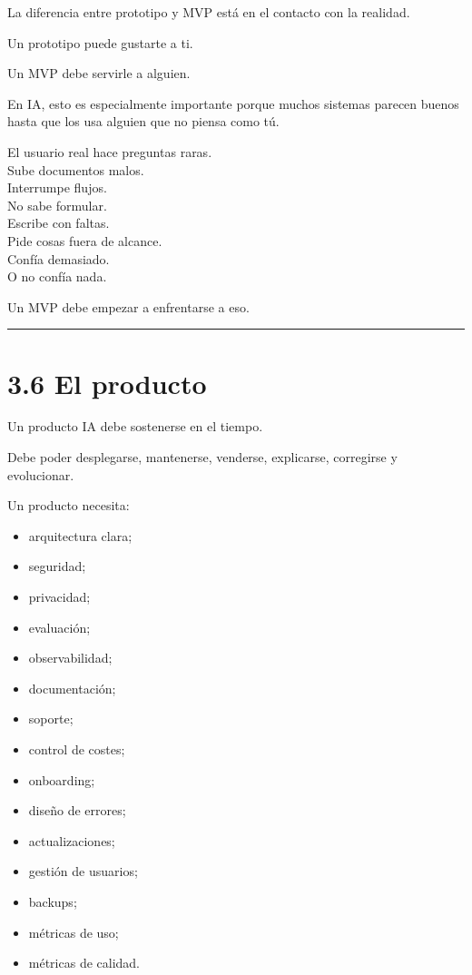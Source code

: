 La diferencia entre prototipo y MVP está en el contacto con la realidad.

Un prototipo puede gustarte a ti.

Un MVP debe servirle a alguien.

En IA, esto es especialmente importante porque muchos sistemas parecen
buenos hasta que los usa alguien que no piensa como tú.

El usuario real hace preguntas raras.\\
Sube documentos malos.\\
Interrumpe flujos.\\
No sabe formular.\\
Escribe con faltas.\\
Pide cosas fuera de alcance.\\
Confía demasiado.\\
O no confía nada.

Un MVP debe empezar a enfrentarse a eso.

\begin{center}\rule{0.5\linewidth}{0.5pt}\end{center}

\section{3.6 El producto}\label{el-producto}

Un producto IA debe sostenerse en el tiempo.

Debe poder desplegarse, mantenerse, venderse, explicarse, corregirse y
evolucionar.

Un producto necesita:

\begin{itemize}
\tightlist
\item
  arquitectura clara;
\item
  seguridad;
\item
  privacidad;
\item
  evaluación;
\item
  observabilidad;
\item
  documentación;
\item
  soporte;
\item
  control de costes;
\item
  onboarding;
\item
  diseño de errores;
\item
  actualizaciones;
\item
  gestión de usuarios;
\item
  backups;
\item
  métricas de uso;
\item
  métricas de calidad.
\end{itemize}


